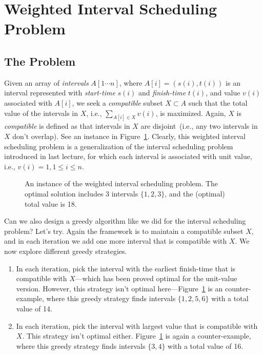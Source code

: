 \setcounter{definition}{0} \setcounter{property}{0} \setcounter{claim}{0} \setcounter{fact}{0} \setcounter{corollary}{0} \setcounter{figure}{0}
\section{Weighted Interval Scheduling Problem}

\subsection*{The Problem}

Given an array of \emph{intervals} $A[1\cdots n]$, where $A[i] = (s(i),t(i))$ is an interval represented with
\emph{start-time} $s(i)$ and \emph{finish-time} $t(i)$, and value $v(i)$ associated with $A[i]$, we seek a \emph{compatible} subset $X\subset A$
such that the total value of the intervals in $X$, i.e., $\sum_{A[i]\in X} v(i)$,
is maximized. Again, $X$ is \emph{compatible} is defined as that intervals in $X$
are disjoint~(i.e., any two intervals in $X$ don't overlap).  See an instance in Figure~\ref{fig:weighted-interval}.
Clearly, this weighted interval scheduling problem is a generalization
of the interval scheduling problem introduced in last lecture,
for which each interval is associated with unit value, i.e., $v(i) = 1, 1\le i \le n$.


\begin{figure}[h]
\centering{}
\caption{An instance of the weighted interval scheduling problem.
The optimal solution includes 3 intervals $\{1, 2, 3\}$,
and the (optimal) total value is 18.}
\label{fig:weighted-interval}
\end{figure}

Can we also design a greedy algorithm like we did for the interval scheduling problem?
Let's try. Again the framework is to maintain a compatible subset $X$, and
in each iteration we add one more interval that is compatible with $X$.
We now explore different greedy strategies. 

\begin{enumerate}
\item In each iteration, pick the interval with the earliest finish-time that is compatible with $X$---which has been proved optimal for the unit-value version.
However, this strategy isn't optimal here---Figure~\ref{fig:weighted-interval} is an counter-example, where this greedy strategy finds intervals $\{1, 2, 5, 6\}$ with a total value of 14.
\item In each iteration, pick the interval with largest value that is compatible with $X$.
This strategy isn't optimal either.
Figure~\ref{fig:weighted-interval} is again a counter-example, where this greedy strategy finds intervals $\{3, 4\}$ with a total value of 16.
\end{enumerate}

